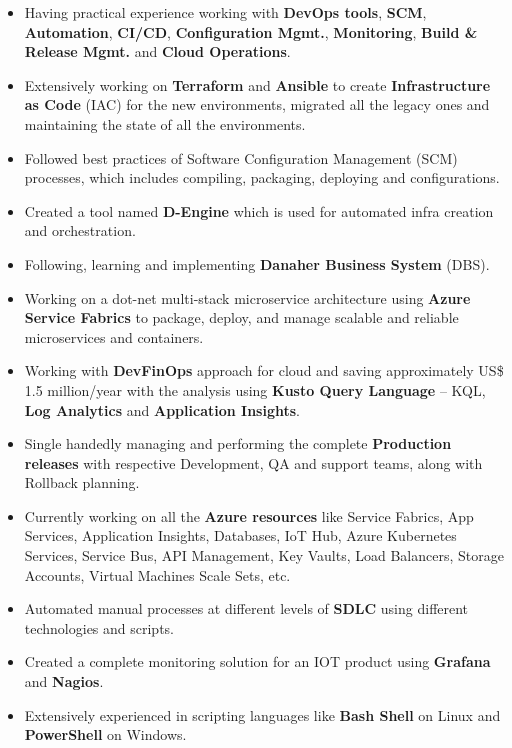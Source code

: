 \documentclass[11pt, a4paper]{article}
\begin{document}
\begin{itemize}[noitemsep, nolistsep,leftmargin=5mm,rightmargin=2mm,label=\textcolor{NavyBlue}{\textbullet}]
\item Having practical experience working with \textbf{DevOps tools}, \textbf{SCM}, \textbf{Automation}, \textbf{CI/CD}, \textbf{Configuration Mgmt.}, \textbf{Monitoring}, \textbf{Build \& Release Mgmt. }and \textbf{Cloud Operations}.
\item Extensively working on \textbf{Terraform} and \textbf{Ansible} to create \textbf{Infrastructure as Code} (IAC) for the new environments, migrated all the legacy ones and maintaining the state of all the environments.
\item Followed best practices of Software Configuration Management (SCM) processes, which includes compiling, packaging, deploying and configurations.
\item Created a tool named \textbf{D-Engine} which is used for automated infra creation and orchestration.
\item Following, learning and implementing \textbf{Danaher Business System} (DBS).
\item Working on a dot-net multi-stack microservice architecture using \textbf{Azure Service Fabrics} to package, deploy, and manage scalable and reliable microservices and containers.
\item Working with \textbf{DevFinOps} approach for cloud and saving  approximately US\$ 1.5 million/year with the analysis using \textbf{Kusto Query Language} – KQL, \textbf{Log Analytics} and \textbf{Application Insights}.
\item Single handedly managing and performing the complete \textbf{Production releases} with respective Development, QA and support teams, along with Rollback planning.
\item Currently working on all the \textbf{Azure resources} like Service Fabrics, App Services, Application Insights, Databases, IoT Hub, Azure Kubernetes Services, Service Bus, API Management, Key Vaults, Load Balancers, Storage Accounts, Virtual Machines Scale Sets, etc.
\item Automated manual processes at different levels of \textbf{SDLC} using different technologies and scripts.
\item Created a complete monitoring solution for an IOT product using \textbf{Grafana} and \textbf{Nagios}.
\item Extensively experienced in scripting languages like \textbf{Bash Shell} on Linux and \textbf{PowerShell} on Windows.

\end{itemize}
\end{document}
